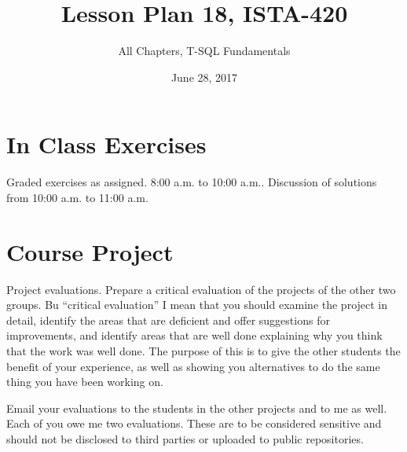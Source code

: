 \documentclass{article}
\title{Lesson Plan 18, ISTA-420}
\author{All Chapters, T-SQL Fundamentals}
\date{June 28, 2017}
\begin{document}
    

    \maketitle{}


    \section{In Class Exercises}

    Graded exercises as assigned. 8:00 a.m. to 10:00 a.m.. Discussion of solutions from 10:00 a.m. to 11:00 a.m.

    \section{Course Project}

    Project evaluations. Prepare a critical evaluation of the projects of the other two groups. Bu ``critical evaluation'' I mean that you should examine the project in detail, identify the areas that are deficient and offer suggestions for improvements, and identify areas that are well done explaining why you think that the work was well done. The purpose of this is to give the other students the benefit of your experience, as well as showing you alternatives to do the same thing you have been working on.

    Email your evaluations to the students in the other projects and to me as well. Each of you owe me two evaluations. These are to be considered sensitive and should not be disclosed to third parties or uploaded to public repositories.
\end{document}
